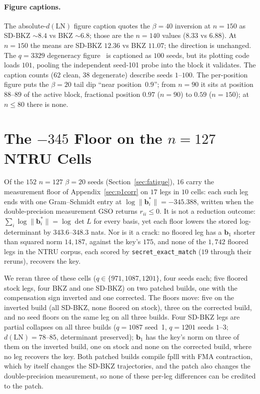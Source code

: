 \documentclass[journal=cic,version=preprint]{iacrj}
\begin{document}
\paragraph{Figure captions.} The absolute-$d(\mathrm{LN})$ figure caption quotes
the $\beta=40$ inversion at $n=150$ as SD-BKZ ${\sim}8.4$ vs BKZ ${\sim}6.8$;
those are the $n=140$ values ($8.33$ vs $6.88$). At $n=150$ the means are
SD-BKZ $12.36$ vs BKZ $11.07$; the direction is unchanged. The $q=3329$
degeneracy figure~\cite[\S8]{Paper1} is captioned as $100$ seeds, but its plotting code
loads $101$, pooling the independent seed-101 probe into the block it
validates. The caption counts ($62$ clean, $38$ degenerate) describe
seeds $1$--$100$. The per-position figure puts the $\beta=20$ tail dip
``near position~$0.9$''; from $n=90$ it sits at position $88$--$89$ of the
active block, fractional position $0.97$ ($n=90$) to $0.59$ ($n=150$); at
$n\le80$ there is none.

\section{The \texorpdfstring{$-345$}{-345} Floor on the \texorpdfstring{$n=127$}{n=127} NTRU Cells}
\label{sec:kahan}

Of the $152$ $n=127$ $\beta=20$ seeds (Section~\ref{sec:fatigue}), $16$
carry the measurement floor of Appendix~\ref{sec:p1corr} on $17$ legs in
$10$ cells: each such leg ends with one Gram--Schmidt entry at
$\log\|\mathbf b_i^\ast\|=-345.388$, written when the double-precision
measurement GSO returns $r_{ii}\le0$. It is not a reduction outcome:
$\sum_i\log\|\mathbf b_i^\ast\|=\log\det L$ for every basis, yet each floor
lowers the stored log-determinant by $343.6$--$348.3$ nats. Nor is it a crack:
no floored leg has a $\mathbf b_1$ shorter than squared norm $14{,}187$,
against the key's $175$, and none of the $1{,}742$ floored legs in the NTRU corpus, each scored by
\texttt{secret\_exact\_match} ($19$ through their reruns), recovers the key.

We reran three of these cells ($q\in\{971,1087,1201\}$, four seeds each;
five floored stock legs, four BKZ and one SD-BKZ) on two patched builds,
one with the compensation sign inverted and one corrected. The floors move:
five on the inverted build (all SD-BKZ, none floored on stock), three on the
corrected build, and no seed floors on the same leg on all three builds.
Four SD-BKZ legs are partial collapses on all three builds ($q=1087$
seed~1, $q=1201$ seeds $1$--$3$; $d(\mathrm{LN})=78$--$85$, determinant
preserved); $\mathbf b_1$ has the key's norm on three of them on the
inverted build, one on stock and none on the corrected build, where no leg
recovers the key. Both patched builds compile fplll with FMA contraction,
which by itself changes the SD-BKZ trajectories, and the patch also changes
the double-precision measurement, so none of these per-leg differences can
be credited to the patch.


\end{document}
